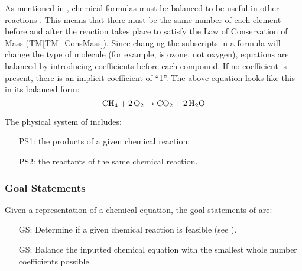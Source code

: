 \documentclass[12pt]{article}
\newcommand{\tmref}[1]{TM\ref{#1}}
\newcounter{goalnum} %
\begin{document}
 As mentioned in
, chemical formulas must be balanced to be
useful in other reactions \cite{lund_introduction_2023}. This means that there
must be the same number of each element before and after the reaction takes
place to satisfy the Law of Conservation of Mass (\tmref{TM_ConsMass}). Since
changing the subscripts in a formula will change the type of molecule (for
example,  is ozone, not oxygen), equations are balanced by introducing
coefficients before each compound. If no coefficient is present, there is an
implicit coefficient of ``1''. The above equation looks like this in its
balanced form:
$$
  \ce{CH4} + \ce{2O2} \rightarrow \ce{CO2} + \ce{2H2O}
$$

The physical system of \progname{} includes:

\begin{itemize}

  \item[PS1:] the products of a given chemical reaction;

  \item[PS2:] the reactants of the same chemical reaction.

\end{itemize}


\subsubsection{Goal Statements} \label{sec_goals}
Given a representation of a chemical equation, the goal statements
of \progname{} are:

\begin{itemize}

  \item[GS\refstepcounter{goalnum}\thegoalnum \label{G_feasible}:] Determine if
    a given chemical reaction is feasible (see ).

  \item[GS\refstepcounter{goalnum}\thegoalnum \label{G_balance}:] Balance the
    inputted chemical equation with the smallest whole number coefficients
    possible.

\end{itemize}
\end{document}
